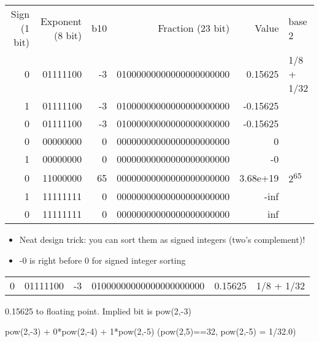 \documentclass[11pt]{article}
\begin{document}
\begin{center}
\begin{tabular}{rrrrrl}
Sign (1 bit) & Exponent (8 bit) & b10 & Fraction (23 bit) & Value & base 2\\
0 & 01111100 & -3 & 01000000000000000000000 & 0.15625 & 1/8 + 1/32\\
1 & 01111100 & -3 & 01000000000000000000000 & -0.15625 & \\
0 & 01111100 & -3 & 01000000000000000000000 & -0.15625 & \\
0 & 00000000 & 0 & 00000000000000000000000 & 0 & \\
1 & 00000000 & 0 & 00000000000000000000000 & -0 & \\
0 & 11000000 & 65 & 00000000000000000000000 & 3.68e+19 & 2\textsuperscript{65}\\
1 & 11111111 & 0 & 00000000000000000000000 & -inf & \\
0 & 11111111 & 0 & 00000000000000000000000 & inf & \\
\end{tabular}
\end{center}

\begin{itemize}
\item Neat design trick: you can sort them as signed integers (two's complement)!
\item -0 is right before 0 for signed integer sorting
\end{itemize}

\begin{center}
\begin{tabular}{rrrrrl}
0 & 01111100 & -3 & 01000000000000000000000 & 0.15625 & 1/8 + 1/32\\
\end{tabular}
\end{center}

0.15625 to floating point. Implied bit is pow(2,-3)

pow(2,-3) + 0*pow(2,-4) + 1*pow(2,-5) (pow(2,5)==32, pow(2,-5) = 1/32.0)
\end{document}
